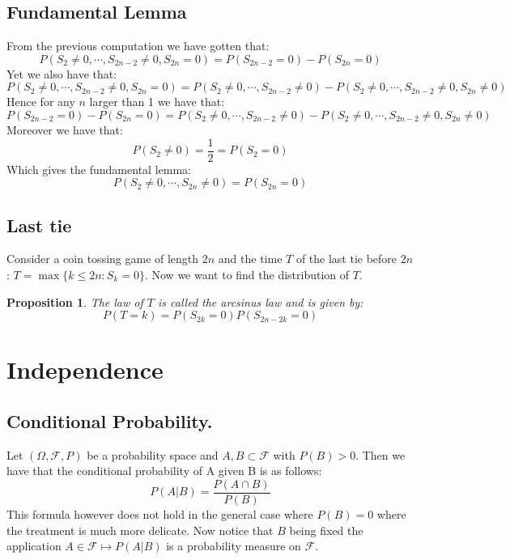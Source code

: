 \documentclass[10pt,a4paper]{book}
\newtheorem{proposition}{Proposition}[section]
\theoremstyle{definition}
\begin{document}
\section{Fundamental Lemma}
From the previous computation we have gotten that:
\[
P(S_2 \neq 0, \cdots, S_{2n - 2}\neq 0, S_{2n} = 0) = P(S_{2n - 2} = 0) - P(S_{2n} = 0)
\]
Yet we also have that:
\[
P(S_2 \neq 0, \cdots, S_{2n - 2}\neq 0, S_{2n} = 0) = P(S_2 \neq 0, \cdots, S_{2n - 2}\neq 0) - P(S_2 \neq 0, \cdots, S_{2n - 2}\neq 0, S_{2n} \neq 0)
\]
Hence for any $n$ larger than 1 we have that:
\[
P(S_{2n - 2} = 0) - P(S_{2n} = 0) = P(S_2 \neq 0, \cdots, S_{2n - 2}\neq 0) - P(S_2 \neq 0, \cdots, S_{2n - 2}\neq 0, S_{2n} \neq 0)
\]
Moreover we have that:
\[
P(S_2 \neq 0 ) = \frac{1}{2} = P(S_2 = 0)
\]
Which gives the fundamental lemma:
\[
P(S_2 \neq 0, \cdots, S_{2n} \neq 0) = P(S_{2n} = 0)
\]

\section{Last tie}
Consider a coin tossing game of length $2n$ and the time $T$ of the last tie before $2n$: $T = \max\{k \leq 2n : S_k = 0\}$. Now we want to find the distribution of $T$. 
\begin{proposition}
The law of $T$ is called the arcsinus law and is given by:
\[
P(T = k) = P(S_{2k} = 0)P(S_{2n - 2k} = 0)
\]
\end{proposition}

\chapter{Independence} 

\section{Conditional Probability.}

Let $(\Omega, \mathcal{F}, P)$ be a probability space and $A, B \subset \mathcal{F}$ with $P(B) > 0$. Then we have that the conditional probability of A given B is as follows:
\[
P(A | B) = \frac{P(A \cap B)}{P(B)}
\]
This formula however does not hold in the general case where $P(B) = 0$ where the treatment is much more delicate. Now notice that $B$ being fixed the application $A \in \mathcal{F} \mapsto P(A|B)$ is a probability measure on $\mathcal{F}$. 
\end{document}

